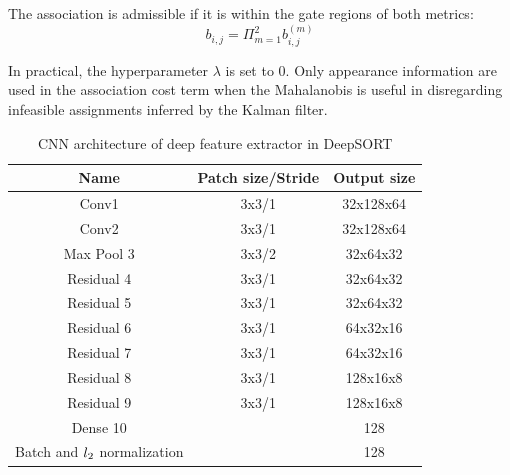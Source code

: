 The association is admissible if it is within the gate regions of both metrics:
\begin{equation}
    b_{i,j}=\Pi^2_{m=1}b^{(m)}_{i,j}
\end{equation}\par
In practical, the hyperparameter $\lambda$ is set to 0. Only appearance information are used in the association cost term when the Mahalanobis is useful in disregarding infeasible assignments inferred by the Kalman filter.
\begin{table}[H]
\begin{center}
 \begin{tabular}{||c c c ||} 
 \hline
 Name & Patch size/Stride & Output size \\ [0.5ex] 
 \hline\hline
 Conv1 & 3x3/1 & 32x128x64  \\ 
 Conv2 & 3x3/1 & 32x128x64 \\
 Max Pool 3 & 3x3/2 & 32x64x32 \\
 Residual 4 & 3x3/1 & 32x64x32 \\
 Residual 5 & 3x3/1 & 32x64x32 \\
 Residual 6 & 3x3/1 & 64x32x16 \\
 Residual 7 & 3x3/1 & 64x32x16 \\
 Residual 8 & 3x3/1 & 128x16x8 \\
 Residual 9 & 3x3/1 & 128x16x8 \\
 Dense 10   &       & 128    \\
 Batch and $\mathnormal{l}_2$ normalization &  & 128 \\
 \hline

 \hline
\end{tabular}
\end{center}
    \caption{CNN architecture of deep feature extractor in DeepSORT}
    \label{tab:cnn_deepsort_arch}
\end{table}
